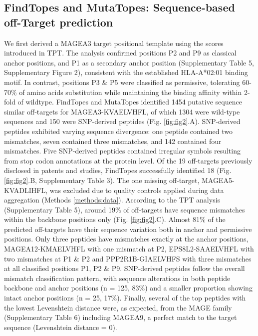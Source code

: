 \documentclass[times, twoside, watermark]{zHenriquesLab-StyleBioRxiv}
\begin{document}
    \subsection*{FindTopes and MutaTopes: Sequence-based off-Target prediction}
        We first derived a MAGEA3 target positional template using the scores introduced in TPT. The analysis confirmed positions P2 and P9 as classical anchor positions, and P1 as a secondary anchor position (Supplementary Table 5, Supplementary Figure 2), consistent with the established HLA-A*02:01 binding motif. In contrast, positions P3 \& P5 were classified as permissive, tolerating 60-70\% of amino acids substitution while maintaining the binding affinity within 2-fold of wildtype. 
        FindTopes and MutaTopes identified 1454 putative sequence similar off-targets for MAGEA3-KVAELVHFL, of which 1304 were wild-type sequences and 150 were SNP-derived peptides (Fig. \ref{fig:fig2}.A). SNP-derived peptides exhibited varying sequence divergence: one peptide contained two mismatches, seven contained three mismatches, and 142 contained four mismatches. Five SNP-derived peptides contained irregular symbols resulting from stop codon annotations at the protein level.
        Of the 19 off-targets previously disclosed in patents and studies, FindTopes successfully identified 18 (Fig. \ref{fig:fig2}.B, Supplementary Table 3). The one missing off-target, MAGEA5-KVADLIHFL, was excluded due to quality controls applied during data aggregation (Methods \ref{methods:data}).
        According to the TPT analysis (Supplementary Table 5), around 19\% of off-targets have sequence mismatches within the backbone positions only (Fig. \ref{fig:fig2}.C). Almost 81\% of the predicted off-targets have their sequence variation both in anchor and permissive positions. Only three peptides have mismatches exactly at the anchor positions, MAGEA12-KMAELVHFL with one mismatch at P2, EPS8L2-SAAELVHFL with two mismatches at P1 \& P2 and PPP2R1B-GIAELVHFS with three mismatches at all classified positions P1, P2 \& P9. SNP-derived peptides follow the overall mismatch classification pattern, with sequence alterations in both peptide backbone and anchor positions (n = 125, 83\%) and a smaller proportion showing intact anchor positions (n = 25, 17\%).
        Finally, several of the top peptides with the lowest Levenshtein distance were, as expected, from the MAGE family (Supplementary Table 6) including MAGEA9, a perfect match to the target sequence (Levenshtein distance = 0).
\end{document}
